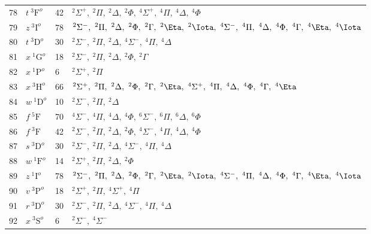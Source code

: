 \begin{table*}[]
\begin{tabular*}{\textwidth}{llll@{\extracolsep{\fill}}}
 78 & $ t~^3\mathrm{F}^o $ &   42& $   ^{2}\Sigma^+,\  ^{2}\Pi,\     ^{2}\Delta,\ ^{2}\Phi,\   ^{4}\Sigma^+,\  ^{4}\Pi,\     ^{4}\Delta,\ ^{4}\Phi$ \\
 79 & $ z~^3\mathrm{I}^o $ &   78& $   ^{2}\Sigma^-,\  ^{2}\Pi,\     ^{2}\Delta,\ ^{2}\Phi,\     ^{2}\Gamma,\ ^{2}\Eta,\      ^{2}\Iota,\   ^{4}\Sigma^-,\  ^{4}\Pi,\     ^{4}\Delta,\ ^{4}\Phi,\     ^{4}\Gamma,\ ^{4}\Eta,\      ^{4}\Iota$ \\
 80 & $ t~^3\mathrm{D}^o $ &   30& $   ^{2}\Sigma^-,\  ^{2}\Pi,\     ^{2}\Delta,\   ^{4}\Sigma^-,\  ^{4}\Pi,\     ^{4}\Delta$ \\
 81 & $ x~^1\mathrm{G}^o $ &   18& $   ^{2}\Sigma^-,\  ^{2}\Pi,\     ^{2}\Delta,\ ^{2}\Phi,\     ^{2}\Gamma$ \\
 82 & $ x~^1\mathrm{P}^o $ &    6& $   ^{2}\Sigma^+,\  ^{2}\Pi$ \\
 83 & $ x~^3\mathrm{H}^o $ &   66& $   ^{2}\Sigma^+,\  ^{2}\Pi,\     ^{2}\Delta,\ ^{2}\Phi,\     ^{2}\Gamma,\ ^{2}\Eta,\   ^{4}\Sigma^+,\  ^{4}\Pi,\     ^{4}\Delta,\ ^{4}\Phi,\     ^{4}\Gamma,\ ^{4}\Eta$ \\
 84 & $ w~^1\mathrm{D}^o $ &   10& $   ^{2}\Sigma^-,\  ^{2}\Pi,\     ^{2}\Delta$ \\
 85 & $   f~^5\mathrm{F} $ &   70& $   ^{4}\Sigma^-,\  ^{4}\Pi,\     ^{4}\Delta,\ ^{4}\Phi,\   ^{6}\Sigma^-,\  ^{6}\Pi,\     ^{6}\Delta,\ ^{6}\Phi$ \\
 86 & $   f~^3\mathrm{F} $ &   42& $   ^{2}\Sigma^-,\  ^{2}\Pi,\     ^{2}\Delta,\ ^{2}\Phi,\   ^{4}\Sigma^-,\  ^{4}\Pi,\     ^{4}\Delta,\ ^{4}\Phi$ \\
 87 & $ s~^3\mathrm{D}^o $ &   30& $   ^{2}\Sigma^-,\  ^{2}\Pi,\     ^{2}\Delta,\   ^{4}\Sigma^-,\  ^{4}\Pi,\     ^{4}\Delta$ \\
 88 & $ w~^1\mathrm{F}^o $ &   14& $   ^{2}\Sigma^+,\  ^{2}\Pi,\     ^{2}\Delta,\ ^{2}\Phi$ \\
 89 & $ z~^1\mathrm{I}^o $ &   78& $   ^{2}\Sigma^-,\  ^{2}\Pi,\     ^{2}\Delta,\ ^{2}\Phi,\     ^{2}\Gamma,\ ^{2}\Eta,\      ^{2}\Iota,\   ^{4}\Sigma^-,\  ^{4}\Pi,\     ^{4}\Delta,\ ^{4}\Phi,\     ^{4}\Gamma,\ ^{4}\Eta,\      ^{4}\Iota$ \\
 90 & $ v~^3\mathrm{P}^o $ &   18& $   ^{2}\Sigma^+,\  ^{2}\Pi,\   ^{4}\Sigma^+,\  ^{4}\Pi$ \\
 91 & $ r~^3\mathrm{D}^o $ &   30& $   ^{2}\Sigma^-,\  ^{2}\Pi,\     ^{2}\Delta,\   ^{4}\Sigma^-,\  ^{4}\Pi,\     ^{4}\Delta$ \\
 92 & $ x~^3\mathrm{S}^o $ &    6& $   ^{2}\Sigma^-,\   ^{4}\Sigma^-$ \\

\end{tabular*}
\end{table*}
